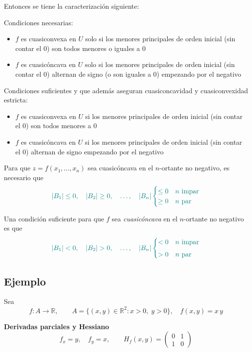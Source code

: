 \documentclass{article}
\newcommand{\R}{\ensuremath{\mathbb{R}}}
\begin{document}
\noindent Entonces se tiene la caracterización siguiente:

Condiciones necesarias:
\begin{itemize}
  \item {\color{teal}\(f\) es cuasiconvexa en \(U\) solo si los menores principales de orden inicial (sin contar el 0) son todos menores o iguales a 0}
  \item {\color{teal}\(f\) es cuasicóncava en \(U\) solo si los menores principales de orden inicial (sin contar el 0) alternan de signo (o son iguales a 0) empezando por el negativo}
\end{itemize}

Condiciones suficientes y que además aseguran cuasiconcavidad y cuasiconvexidad estricta:
\begin{itemize}
  \item {\color{teal}\(f\) es cuasiconvexa en \(U\) si los menores principales de orden inicial (sin contar el 0) son todos menores a 0}
  \item {\color{teal}\(f\) es cuasicóncava en \(U\) si los menores principales de orden inicial (sin contar el 0) alternan de signo empezando por el negativo}
\end{itemize}

Para que \(z = f(x_1,\dots,x_n)\) sea cuasicóncava en el \(n\)-ortante no negativo, es necesario que
\[
\color{teal}
|B_1| \le 0,\quad
|B_2| \ge 0,\quad
\dots,\quad
|B_n|
\begin{cases}
\le 0 & n\text{ impar}\\
\ge 0 & n\text{ par}
\end{cases}
\]

Una condición suficiente para que \(f\) sea \emph{cuasicóncava} en el \(n\)-ortante no negativo es que
\[
\color{teal}
|B_1| < 0,\quad
|B_2| > 0,\quad
\dots,\quad
|B_n|
\begin{cases}
< 0 & n\text{ impar}\\[4pt]
> 0 & n\text{ par}
\end{cases}
\]

\subsection*{Ejemplo}

Sea 
\[
f\colon A\to\R,
\qquad
A=\{(x,y)\in\R^2:x>0,\;y>0\},
\quad
f(x,y)=x\,y
\]

\medskip

\noindent\textbf{Derivadas parciales y Hessiano}\\
\[
f_x = y,\quad f_y = x,
\qquad
H_f(x,y)
= \begin{pmatrix}
0 & 1\\[4pt]
1 & 0
\end{pmatrix}
\]
\end{document}
